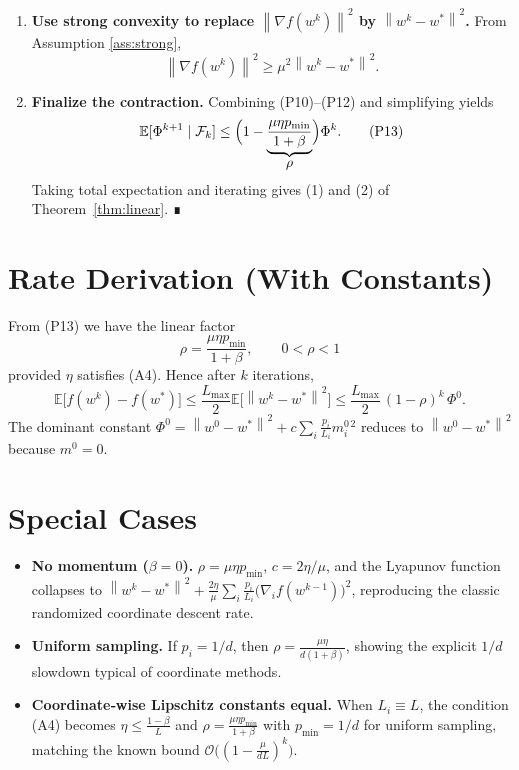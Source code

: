 \documentclass{article}
\newcommand{\E}{\mathbb{E}}
\newcommand{\norm}[1]{\left\lVert#1\right\rVert}
\begin{document}
\begin{enumerate}
\item[Step 11.] \textbf{Use strong convexity to replace $\norm{\nabla f(w^{k})}^{2}$ by $\norm{w^{k}-w^{*}}^{2}$.}  
From Assumption \ref{ass:strong},
\[
\norm{\nabla f(w^{k})}^{2}\ge \mu^{2}\norm{w^{k}-w^{*}}^{2}.
\tag{P12}
\]

\item[Step 12.] \textbf{Finalize the contraction.}  
Combining (P10)–(P12) and simplifying yields
\[
\E[\Phi^{k+1}\mid\mathcal{F}_{k}]
\le \Bigl(1-\underbrace{\frac{\mu\eta p_{\min}}{1+\beta}}_{\displaystyle \rho}\Bigr)\Phi^{k}.
\tag{P13}
\]
Taking total expectation and iterating gives (1) and (2) of Theorem~\ref{thm:linear}. ∎
\end{enumerate}

\section*{Rate Derivation (With Constants)}
From (P13) we have the linear factor
\[
\rho = \frac{\mu\eta p_{\min}}{1+\beta},
\qquad 0<\rho<1
\]
provided $\eta$ satisfies (A4).  
Hence after $k$ iterations,
\[
\E\!\bigl[f(w^{k})-f(w^{*})\bigr]
\le \frac{L_{\max}}{2}\E\!\bigl[\norm{w^{k}-w^{*}}^{2}\bigr]
\le \frac{L_{\max}}{2}\,(1-\rho)^{k}\,\Phi^{0}.
\]
The dominant constant $\Phi^{0}= \norm{w^{0}-w^{*}}^{2}+c\sum_i\frac{p_i}{L_i}m_i^{0\,2}$ reduces to $\norm{w^{0}-w^{*}}^{2}$ because $m^{0}=0$.

\section*{Special Cases}
\begin{itemize}
\item \textbf{No momentum ($\beta=0$).}  
$\rho=\mu\eta p_{\min}$, $c=2\eta/\mu$, and the Lyapunov function collapses to $\norm{w^{k}-w^{*}}^{2}+ \frac{2\eta}{\mu}\sum_i\frac{p_i}{L_i}\bigl(\nabla_i f(w^{k-1})\bigr)^{2}$, reproducing the classic randomized coordinate descent rate.
\item \textbf{Uniform sampling.}  
If $p_i=1/d$, then $\rho = \frac{\mu\eta}{d(1+\beta)}$, showing the explicit $1/d$ slowdown typical of coordinate methods.
\item \textbf{Coordinate‑wise Lipschitz constants equal.}  
When $L_i\equiv L$, the condition (A4) becomes $\eta\le\frac{1-\beta}{L}$ and $\rho = \frac{\mu\eta p_{\min}}{1+\beta}$ with $p_{\min}=1/d$ for uniform sampling, matching the known bound $\mathcal{O}\bigl((1-\frac{\mu}{dL})^{k}\bigr)$.
\end{itemize}
\end{document}
